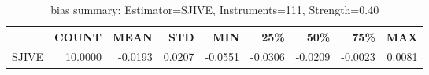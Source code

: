 \begin{table}[ht]
\centering
\caption{bias summary: Estimator=SJIVE, Instruments=111, Strength=0.40}
\begin{tabular}{lrrrrrrrr}
\toprule
 & COUNT & MEAN & STD & MIN & 25\% & 50\% & 75\% & MAX \\
\midrule
SJIVE & 10.0000 & -0.0193 & 0.0207 & -0.0551 & -0.0306 & -0.0209 & -0.0023 & 0.0081 \\
\bottomrule
\end{tabular}
\end{table}
